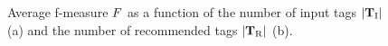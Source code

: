 \begin{figure}
  \centering
     \caption[Average f-measure as a function of the number of input tags and the number of recommended tags]{Average f-measure $F$ as a function of the number of input tags $|\mathbf{T}_{\text{I}}|$ (a) and the number of recommended tags $|\mathbf{T}_{\text{R}}|$ (b).}
  \label{class:fig:f_measure_pb_evaluation}
\end{figure}


